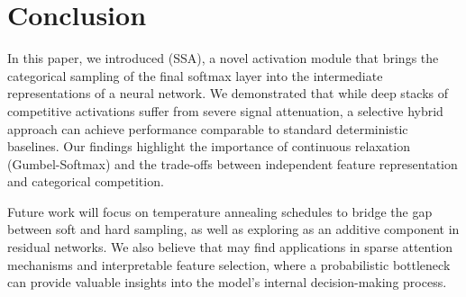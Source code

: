 \section{Conclusion}

In this paper, we introduced \methodname (\textsc{SSA}), a novel activation module that brings the categorical sampling of the final softmax layer into the intermediate representations of a neural network. We demonstrated that while deep stacks of competitive activations suffer from severe signal attenuation, a selective hybrid approach can achieve performance comparable to standard deterministic baselines. Our findings highlight the importance of continuous relaxation (Gumbel-Softmax) and the trade-offs between independent feature representation and categorical competition.

Future work will focus on temperature annealing schedules to bridge the gap between soft and hard sampling, as well as exploring \methodname as an additive component in residual networks. We also believe that \methodname may find applications in sparse attention mechanisms and interpretable feature selection, where a probabilistic bottleneck can provide valuable insights into the model's internal decision-making process.
